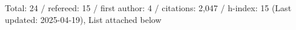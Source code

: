 Total: 24 / refereed: 15 / first author: 4 / citations: 2,047 / h-index: 15 (Last updated: 2025-04-19), List attached below